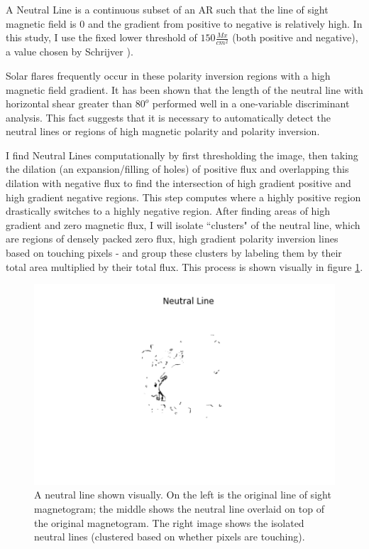 A Neutral Line is a continuous subset of an AR such that the line of sight magnetic field is $0$ and the gradient from positive to negative is relatively high. In this study, I use the fixed lower threshold of $150 \frac{Mx}{cm^2}$ (both positive and negative), a value chosen by Schrijver \cite{schrijver}).

Solar flares frequently occur in these polarity inversion regions with a high magnetic field gradient. It has been shown \cite{Properties2} that the length of the neutral line with horizontal shear greater than $80^o$ performed well in a one-variable discriminant analysis. This fact suggests that it is necessary to automatically detect the neutral lines or regions of high magnetic polarity and polarity inversion.

I find Neutral Lines computationally by first thresholding the image, then taking the dilation (an expansion/filling of holes) of positive flux and overlapping this dilation with negative flux to find the intersection of high gradient positive and high gradient negative regions. This step computes where a highly positive region drastically switches to a highly negative region. After finding areas of high gradient and zero magnetic flux, I will isolate ``clusters" of the neutral line, which are regions of densely packed zero flux, high gradient polarity inversion lines based on touching pixels - and group these clusters by labeling them by their total area multiplied by their total flux. This process is shown visually in figure \ref{fig:neutralline}.
\begin{figure}[h]
\centering
\includegraphics[width=0.5\linewidth]{ThesisFilePkg/figures/data/neutralline.png}
\caption{A neutral line shown visually. On the left is the original line of sight magnetogram; the middle shows the neutral line overlaid on top of the original magnetogram. The right image shows the isolated neutral lines (clustered based on whether pixels are touching).}
\label{fig:neutralline}
\end{figure}

